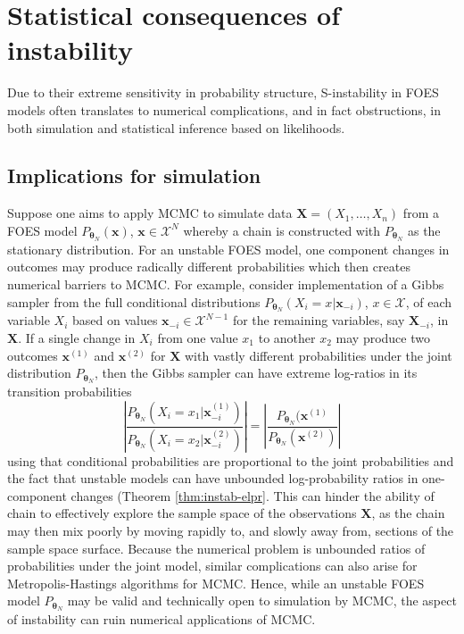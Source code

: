 \documentclass[12pt]{article}
\theoremstyle{definition}
\begin{document}
\section{Statistical consequences of instability}\label{implications}

Due to their extreme sensitivity in probability structure, S-instability
in FOES models often translates to numerical complications, and in fact
obstructions, in both simulation and statistical inference based on
likelihoods.

\subsection{Implications for
simulation}\label{implications-for-simulation}

Suppose one aims to apply MCMC to simulate data
\(\boldsymbol X=(X_1,\ldots,X_n)\) from a FOES model
\(P_{\boldsymbol \theta_N}(\boldsymbol x)\),
\(\boldsymbol x \in\mathcal{X}^N\) whereby a chain is constructed with
\(P_{\boldsymbol \theta_N}\) as the stationary distribution. For an
unstable FOES model, one component changes in outcomes may produce
radically different probabilities which then creates numerical barriers
to MCMC. For example, consider implementation of a Gibbs sampler from
the full conditional distributions
\(P_{\boldsymbol \theta_N} (X_i = x| \boldsymbol x_{-i})\),
\(x\in\mathcal{X}\), of each variable \(X_i\) based on values
\(\boldsymbol x_{-i}\in \mathcal{X}^{N-1}\) for the remaining variables,
say \(\boldsymbol X_{-i}\), in \(\boldsymbol X\). If a single change in
\(X_i\) from one value \(x_1\) to another \(x_2\) may produce two
outcomes \(\boldsymbol x^{(1)}\) and \(\boldsymbol x^{(2)}\) for
\(\boldsymbol X\) with vastly different probabilities under the joint
distribution \(P_{\boldsymbol \theta_N}\), then the Gibbs sampler can
have extreme log-ratios in its transition probabilities \[
\left| \frac{P_{\boldsymbol \theta_N} (X_i =x_1 | \boldsymbol x^{(1)}_{-i})}{P_{\boldsymbol \theta_N} (X_i = x_2| \boldsymbol x^{(2)}_{-i}) } \right|=\left| \frac{P_{\boldsymbol \theta_N} ( \boldsymbol x^{(1)} }{P_{\boldsymbol \theta_N} (  \boldsymbol x^{(2)} ) } \right|
\] using that conditional probabilities are proportional to the joint
probabilities and the fact that unstable models can have unbounded
log-probability ratios in one-component changes (Theorem
\ref{thm:instab-elpr}. This can hinder the ability of chain to
effectively explore the sample space of the observations
\(\boldsymbol X\), as the chain may then mix poorly by moving rapidly
to, and slowly away from, sections of the sample space surface. Because
the numerical problem is unbounded ratios of probabilities under the
joint model, similar complications can also arise for
Metropolis-Hastings algorithms for MCMC. Hence, while an unstable FOES
model \(P_{\boldsymbol \theta_N}\) may be valid and technically open to
simulation by MCMC, the aspect of instability can ruin numerical
applications of MCMC.
\end{document}
